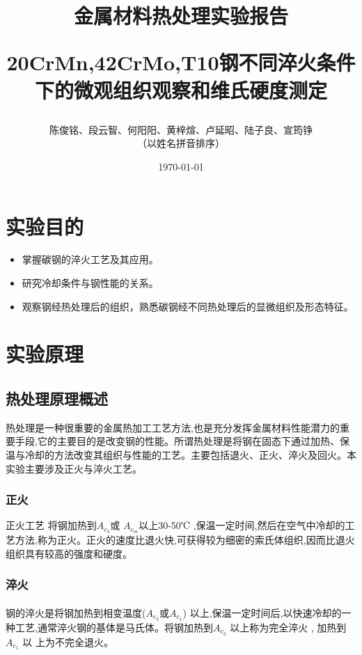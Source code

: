 \documentclass[12pt]{ctexart}
\begin{document}
\title{ \bfseries 金属材料热处理实验报告\\
\begin{large}
20CrMn,42CrMo,T10钢不同淬火条件下的微观组织观察和维氏硬度测定
\end{large}}
\author{陈俊铭、段云智、何阳阳、黄梓煊、卢延昭、陆子良、宣筠铮\\（以姓名拼音排序）}
\date{\today}


\maketitle
\newpage
\thispagestyle{empty}
\tableofcontents
\newpage
\setcounter{page}{1}

\section{实验目的}
\begin{itemize}
\item 掌握碳钢的淬火工艺及其应用。
\item 研究冷却条件与钢性能的关系。
\item 观察钢经热处理后的组织，熟悉碳钢经不同热处理后的显微组织及形态特征。
\end{itemize}

\section{实验原理}
\subsection{热处理原理概述}
热处理是一种很重要的金属热加工工艺方法,也是充分发挥金属材料性能潜力的重要手段,它的主要目的是改变钢的性能。所谓热处理是将钢在固态下通过加热、保温与冷却的方法改变其组织与性能的工艺。主要包括退火、正火、淬火及回火。本实验主要涉及正火与淬火工艺。
\subsubsection{正火}
正火工艺 将钢加热到${A_{{c_3}}}$或 ${A_{{c_m}}}$以上30-50℃ ,保温一定时间,然后在空气中冷却的工艺方法,称为正火。正火的速度比退火快,可获得较为细密的索氏体组织,因而比退火组织具有较高的强度和硬度。
\subsubsection{淬火}
\paragraph{}
 钢的淬火是将钢加热到相变温度(${A_{{c_3}}}$或${A_{{c_1}}}$) 以上,保温一定时间后,以快速冷却的一种工艺,通常淬火钢的基体是马氏体。将钢加热到${A_{{c_3}}}$ 以上称为完全淬火 , 加热到${A_{{c_1}}}$ 以 上为不完全退火。
\end{document}
